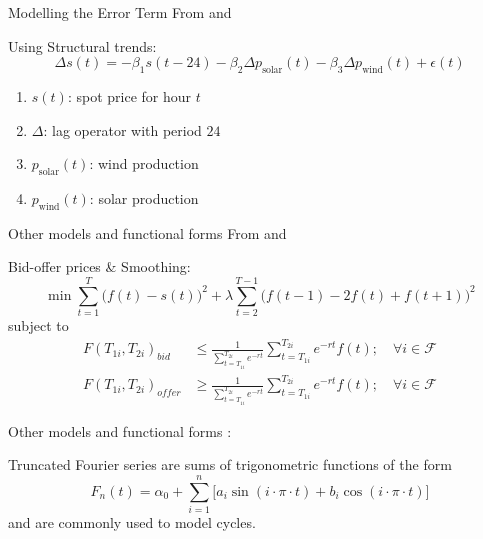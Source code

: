 \documentclass{beamer}
\begin{document}
\begin{frame}{Modelling the Error Term}
    From \cite{deJongDijkenEnev-2013} and \cite{BurgerGraeberSchindlmayr-2014}

    Using Structural trends:
    \[
        \Delta s(t) = -\beta_1 s(t-24)
        - \beta_2 \Delta p_{\text{solar}}(t)
        - \beta_3 \Delta p_{\text{wind}}(t)
        + \epsilon(t)
    \]
    \begin{enumerate}[label=$\bullet$]
        \item $s(t)$: spot price for hour $t$
        \item $\Delta$: lag operator with period $24$
        \item $p_{\text{solar}}(t)$: wind production
        \item $p_{\text{wind}}(t)$: solar production
    \end{enumerate}
\end{frame}



\begin{frame}{Other models and functional forms}
    From \cite{FletenLemming-2003} and \cite{BurgerGraeberSchindlmayr-2014}

    Bid-offer prices \& Smoothing:
    \[
        \min \sum_{t=1}^T \bigg(f(t) - s(t) \bigg)^2
        + \lambda \sum_{t=2}^{T-1} \bigg(
        f(t-1) - 2 f(t) + f(t+1)
        \bigg)^2
    \]
    subject to
    \begin{align*}
        F(T_{1i}, T_{2i})_{bid}
         & \leq
        \frac{1}{\sum_{t=T_{1i}}^{T_{2i}} e^{-rt}}
        \sum_{t=T_{1i}}^{T_{2i}} e^{-rt} f(t);
        \quad \forall i \in \mathcal{F}
        \\
        F(T_{1i}, T_{2i})_{offer}
         & \geq
        \frac{1}{\sum_{t=T_{1i}}^{T_{2i}} e^{-rt}}
        \sum_{t=T_{1i}}^{T_{2i}} e^{-rt} f(t);
        \quad \forall i \in \mathcal{F}
    \end{align*}
\end{frame}


\begin{frame}{Other models and functional forms}
    \cite{Saethero-2017}:

    Truncated Fourier series are sums of trigonometric functions of the form
    \[
        F_n(t)
        = \alpha_0
        + \sum_{i=1}^n \bigg[
            a_i \sin(i \cdot \pi \cdot t) + b_i \cos(i \cdot \pi \cdot t)
            \bigg]
    \]
    and are commonly used to model cycles.
\end{frame}
\end{document}
